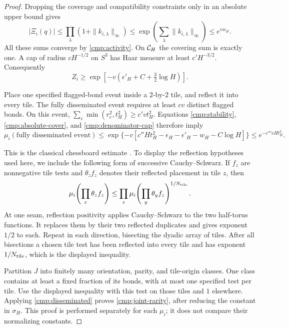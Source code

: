 \begin{proof}
Dropping the coverage and compatibility constraints only in an absolute
upper bound gives
\begin{equation}
 |\Xi_i(q)|
 \le\prod_\lambda(1+\|k_{i,\lambda}\|_\infty)
 \le\exp\!\left(\sum_\lambda\|k_{i,\lambda}\|_\infty\right)
 \le e^{vw_H}.
 \label{cmp:absolute-cover}
\end{equation}
All these sums converge by \eqref{cmp:activity}.  On \({\cal C}_H\) the
covering sum is exactly one.  A cap of radius \(cH^{-1/2}\) on \(S^3\)
has Haar measure at least \(c'H^{-3/2}\).  Consequently
\begin{equation}
 Z_i\ge
       \exp[-v(\epsilon'_H+C+\tfrac32\log H)].
 \label{cmp:denominator-cap}
\end{equation}

Place one specified flagged-bond event inside a \(2\)-by-\(2\) tile,
and reflect it into every tile.  The fully disseminated event requires
at least \(cv\) distinct flagged bonds.  On this event,
\(\sum_e\min(r_e^2,t_H^2)\ge c'vt_H^2\).  Equations
\eqref{cmp:stability}, \eqref{cmp:absolute-cover}, and
\eqref{cmp:denominator-cap} therefore imply
\begin{equation}
 \mu_i(\text{fully disseminated event})
 \le
 \exp\{-v[c''Ht_H^2-\epsilon_H-\epsilon'_H-w_H-C\log H]\}
 \le e^{-c'''vHt_H^2}.
 \label{cmp:disseminated}
\end{equation}

This is the classical chessboard estimate
\cite[Theorems 4.1--4.3]{FILS78}. To display the reflection hypotheses
used here, we include the following form of
successive Cauchy--Schwarz.  If \(f_z\) are nonnegative tile tests and
\(\theta_z f_z\) denotes their reflected placement in tile \(z\), then
\[
 \mu_i\!\left(\prod_z\theta_zf_z\right)
 \le
 \prod_z
 \mu_i\!\left(\prod_y\theta_y f_z\right)^{1/N_{\rm tile}}.
\]
At one seam, reflection positivity applies Cauchy--Schwarz to the two
half-torus functions.  It replaces them by their two reflected
duplicates and gives exponent \(1/2\) to each.  Repeat in each direction,
bisecting the dyadic array of tiles.  After all bisections a chosen tile
test has been reflected into every tile and has exponent
\(1/N_{\rm tile}\), which is the displayed inequality.

Partition \(J\) into finitely many orientation, parity, and tile-origin
classes.  One class contains at least a fixed fraction of its bonds,
with at most one specified test per tile.  Use the displayed inequality
with this test on those tiles and \(1\) elsewhere.  Applying
\eqref{cmp:disseminated} proves \eqref{cmp:joint-rarity}, after reducing
the constant in \(\sigma_H\).  This proof is performed separately for
each \(\mu_i\); it does not compare their normalizing constants.
\end{proof}

